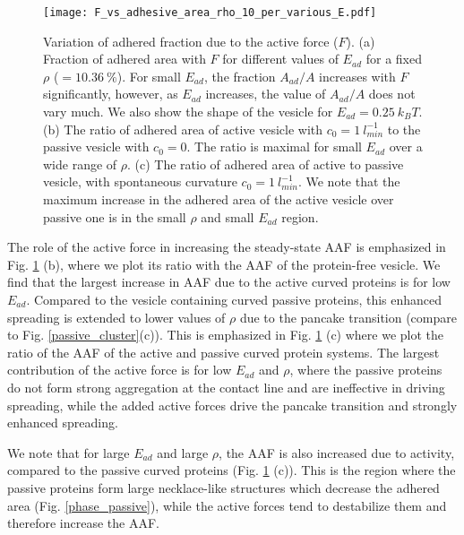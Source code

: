 \documentclass[pre,amsmath]{revtex4}
\begin{document}
\begin{figure}[ht]
\centering
\texttt{[image: F\_vs\_adhesive\_area\_rho\_10\_per\_various\_E.pdf]}
\caption{Variation of adhered fraction due to the active force ($F$). (a) Fraction of adhered area with $F$ for different values of $E_{ad}$ for a fixed $\rho$ ($=10.36~\%$). For small $E_{ad}$, the fraction $A_{ad}/A$ increases with $F$ significantly, however, as $E_{ad}$ increases, the value of  $A_{ad}/A$ does not vary much. We also show the shape of the vesicle for $E_{ad}=0.25 ~k_B T$. (b)  The ratio of adhered area of active vesicle with $c_0=1~l^{-1}_{min}$ to the passive vesicle with $c_0=0$. The ratio is maximal for small $E_{ad}$ over a wide range of $\rho$. (c) The ratio of adhered area of active to passive vesicle, with spontaneous curvature $c_0=1~l^{-1}_{min}$. We note that the maximum increase in the adhered area of the active vesicle over passive one is in the small $\rho$ and small $E_{ad}$ region.}
\label{ad_area_active} 
\end{figure}

The role of the active force in increasing the steady-state AAF is emphasized in Fig. \ref{ad_area_active} (b), where we plot its ratio with the AAF of the protein-free vesicle. We find that the largest increase in AAF due to the active curved proteins is for low $E_{ad}$. Compared to the vesicle containing curved passive proteins, this enhanced spreading is extended to lower values of $\rho$ due to the pancake transition (compare to Fig. \ref{passive_cluster}(c)). This is emphasized in Fig. \ref{ad_area_active} (c) where we plot the ratio of the AAF of the active and passive curved protein systems. The largest contribution of the active force is for low $E_{ad}$ and $\rho$, where the passive proteins do not form strong aggregation at the contact line and are ineffective in driving spreading, while the added active forces drive the pancake transition and strongly enhanced spreading.

We note that for large $E_{ad}$ and large $\rho$, the AAF is also increased due to activity, compared to the passive curved proteins (Fig. \ref{ad_area_active} (c)). This is the region where the passive proteins form large necklace-like structures which decrease the adhered area (Fig. \ref{phase_passive}), while the active forces tend to destabilize them and therefore increase the AAF. 
\end{document}
